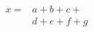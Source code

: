 \documentclass{article}
\begin{document}
\[
\begin{aligned}
x ={}& a+b+c+{} \\
&d+e+f+g
\end{aligned}
\]
\end{document}
